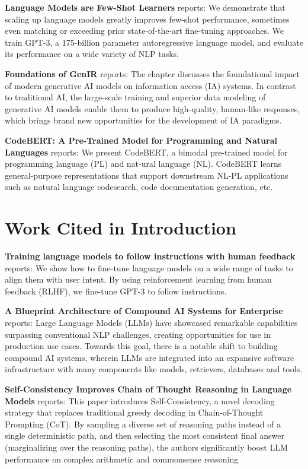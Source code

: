 \documentclass[10pt,journal,compsoc,twocolumn]{IEEEtran}
\begin{document}
\textbf{Language Models are Few-Shot Learners} \cite{arxiv_2005_14165} reports: We demonstrate that scaling up language models greatly improves few-shot performance, sometimes even matching or exceeding prior state-of-the-art fine-tuning approaches. We train GPT-3, a 175-billion parameter autoregressive language model, and evaluate its performance on a wide variety of NLP tasks.

\textbf{Foundations of GenIR} \cite{arxiv_2501_02842} reports: The chapter discusses the foundational impact of modern generative AI models on information access (IA) systems. In contrast to traditional AI, the large-scale training and superior data modeling of generative AI models enable them to produce high-quality, human-like responses, which brings brand new opportunities for the development of IA paradigms.

\textbf{CodeBERT: A Pre-Trained Model for Programming and Natural Languages} \cite{arxiv_2002_08155} reports: We present CodeBERT, a bimodal pre-trained model for programming language (PL) and nat-ural language (NL). CodeBERT learns general-purpose representations that support downstream NL-PL applications such as natural language codesearch, code documentation generation, etc.


\section{Work Cited in Introduction}


\textbf{Training language models to follow instructions with human feedback} \cite{arxiv_2203_02155} reports: We show how to fine-tune language models on a wide range of tasks to align them with user intent. By using reinforcement learning from human feedback (RLHF), we fine-tune GPT-3 to follow instructions.

\textbf{A Blueprint Architecture of Compound AI Systems for Enterprise} \cite{arxiv_2406_00584} reports: Large Language Models (LLMs) have showcased remarkable capabilities surpassing conventional NLP challenges, creating opportunities for use in production use cases. Towards this goal, there is a notable shift to building compound AI systems, wherein LLMs are integrated into an expansive software infrastructure with many components like models, retrievers, databases and tools.

\textbf{Self-Consistency Improves Chain of Thought Reasoning in Language Models} \cite{arxiv_2203_11171} reports: This paper introduces Self-Consistency, a novel decoding strategy that replaces traditional greedy decoding in Chain-of-Thought Prompting (CoT). By sampling a diverse set of reasoning paths instead of a single deterministic path, and then selecting the most consistent final answer (marginalizing over the reasoning paths), the authors significantly boost LLM performance on complex arithmetic and commonsense reasoning 
\end{document}
